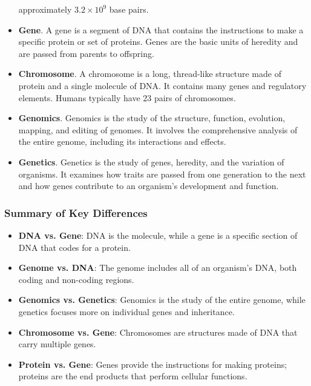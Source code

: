 \documentclass[a4paper]{article}
\begin{document}
\begin{itemize}
   approximately $3.2 \times 10^9$ base pairs.
  \item \textbf{Gene}. A gene is a segment of DNA that contains the instructions to make a specific protein or set of proteins. Genes are the basic units of heredity and are passed from parents to offspring. 
  \item \textbf{Chromosome}. A chromosome is a long, thread-like structure made of protein and a single molecule of DNA. It contains many genes and regulatory elements. Humans typically have 23 pairs of chromosomes.
  \item \textbf{Genomics}. Genomics is the study of the structure, function, evolution, mapping, and editing of genomes. It involves the comprehensive analysis of the entire genome, including its interactions and effects.
  \item \textbf{Genetics}. Genetics is the study of genes, heredity, and the variation of organisms. It examines how traits are passed from one generation to the next and how genes contribute to an organism's development and function.
\end{itemize}

\subsubsection*{Summary of Key Differences}
\begin{itemize}
  \item \textbf{DNA vs. Gene}: DNA is the molecule, while a gene is a specific section of DNA that codes for a protein.
  \item \textbf{Genome vs. DNA}: The genome includes all of an organism's DNA, both coding and non-coding regions.
  \item \textbf{Genomics vs. Genetics}: Genomics is the study of the entire genome, while genetics focuses more on individual genes and inheritance.
  \item \textbf{Chromosome vs. Gene}: Chromosomes are structures made of DNA that carry multiple genes.
  \item \textbf{Protein vs. Gene}: Genes provide the instructions for making proteins; proteins are the end products that perform cellular functions.
\end{itemize}
\end{document}
